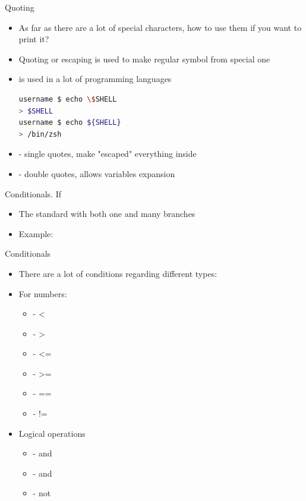 \documentclass[usenames,dvipsnames,10pt,aspectratio=169]{beamer}
\begin{document}
\begin{frame}[fragile]{Quoting}
    \begin{itemize}
        \item As far as there are a lot of special characters, how to use them if you want to print it?
        \item Quoting or escaping is used to make regular symbol from special one
        \item \ex{\textbackslash} is used in a lot of programming languages
        \begin{lstlisting}[language=Bash, style=shellstyle]
username $ echo \$SHELL
> $SHELL
username $ echo ${SHELL}
> /bin/zsh \end{lstlisting}
        \item {} - single quotes, make "escaped" everything inside
        \item {} - double quotes, allows variables expansion
    \end{itemize}
\end{frame}

\begin{frame}{Conditionals. If}
    \begin{itemize}
        \item The standard  with both one and many branches
        
        \item Example:
        
    \end{itemize}
\end{frame}

\begin{frame}{Conditionals}
    \begin{itemize}
        \item There are a lot of conditions regarding different types:
        \item For numbers:
        \begin{itemize}
            \item {} - <
            \item {} - >
            \item {} - <=
            \item {} - >=
            \item {} - ==
            \item {} - !=
        \end{itemize}
        \item Logical operations
        \begin{itemize}
            \item {} - and
            \item {} - and
            \item \ex{!} - not
        \end{itemize}
    \end{itemize}
\end{frame}
\end{document}
